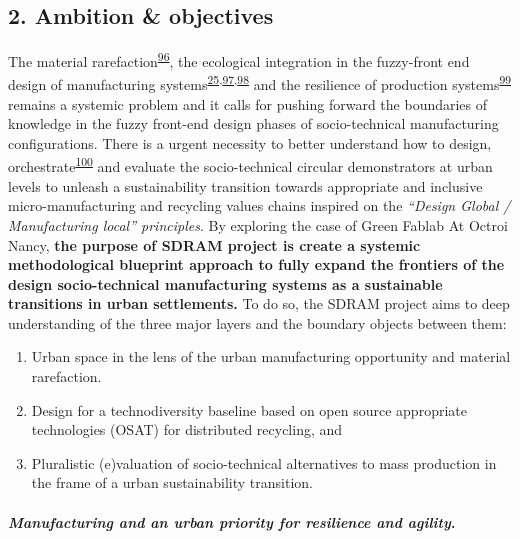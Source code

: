 \documentclass[
  11pt,
  a4paperpaper,
  onecolumn]{article}
\let\oldparagraph\paragraph
\renewcommand{\paragraph}[1]{\oldparagraph{#1}\mbox{}}
\providecommand{\tightlist}{%
  \setlength{\itemsep}{0pt}\setlength{\parskip}{0pt}}\usepackage{longtable,booktabs,array}
\let\paragraph\oldparagraph
\begin{document}
\hypertarget{ambition-objectives}{%
\subsection{2. Ambition \& objectives}\label{ambition-objectives}}

The material
rarefaction\textsuperscript{\protect\hyperlink{ref-hultman2021}{96}},
the ecological integration in the fuzzy-front end design of
manufacturing
systems\textsuperscript{\protect\hyperlink{ref-Bakshi2019a}{25},\protect\hyperlink{ref-Bakshi2015}{97},\protect\hyperlink{ref-Saladini2018}{98}}
and the resilience of production
systems\textsuperscript{\protect\hyperlink{ref-xu2021e}{99}} remains a
systemic problem and it calls for pushing forward the boundaries of
knowledge in the fuzzy front-end design phases of socio-technical
manufacturing configurations. There is a urgent necessity to better
understand how to design,
orchestrate\textsuperscript{\protect\hyperlink{ref-ritala2022}{100}} and
evaluate the socio-technical circular demonstrators at urban levels to
unleash a sustainability transition towards appropriate and inclusive
micro-manufacturing and recycling values chains inspired on the
\emph{``Design Global / Manufacturing local'' principles}. By exploring
the case of Green Fablab At Octroi Nancy, \textbf{the purpose of SDRAM
project is create a systemic methodological blueprint approach to fully
expand the frontiers of the design socio-technical manufacturing systems
as a sustainable transitions in urban settlements.} To do so, the SDRAM
project aims to deep understanding of the three major layers and the
boundary objects between them:

\begin{enumerate}
\def\labelenumi{\arabic{enumi}.}
\tightlist
\item
  Urban space in the lens of the urban manufacturing opportunity and
  material rarefaction.
\item
  Design for a technodiversity baseline based on open source appropriate
  technologies (OSAT) for distributed recycling, and
\item
  Pluralistic (e)valuation of socio-technical alternatives to mass
  production in the frame of a urban sustainability transition.
\end{enumerate}

\hypertarget{manufacturing-and-an-urban-priority-for-resilience-and-agility.}{%
\paragraph{\texorpdfstring{\emph{Manufacturing and an urban priority for
resilience and
agility}.}{Manufacturing and an urban priority for resilience and agility.}}\label{manufacturing-and-an-urban-priority-for-resilience-and-agility.}}
\end{document}
